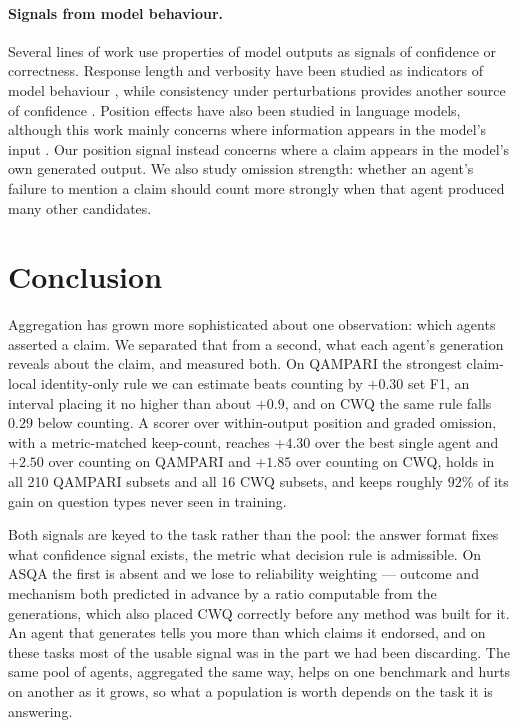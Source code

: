 \documentclass{article}
\begin{document}
\paragraph{Signals from model behaviour.}
Several lines of work use properties of model outputs as signals of confidence or correctness. Response length and verbosity have been studied as indicators of model behaviour \cite{janiak2025illusion,zhang2024verbosity}, while consistency under perturbations provides another source of confidence \cite{wu2026this,ahn2025prompt}. Position effects have also been studied in language models, although this work mainly concerns where information appears in the model's input \cite{guo2024serial,zhang2026position,salvatore2025lost,qiao2026llm}. Our position signal instead concerns where a claim appears in the model's own generated output. We also study omission strength: whether an agent's failure to mention a claim should count more strongly when that agent produced many other candidates.



\section{Conclusion}
\label{sec:conclusion}

Aggregation has grown more sophisticated about one observation: which agents asserted a claim. We separated that from a second, what each agent's generation reveals about the claim, and measured both. On QAMPARI the strongest claim-local identity-only rule we can estimate beats counting by $+0.30$ set F1, an interval placing it no higher than about $+0.9$, and on CWQ the same rule falls $0.29$ below counting. A scorer over within-output position and graded omission, with a metric-matched keep-count, reaches $+4.30$ over the best single agent and $+2.50$ over counting on QAMPARI and $+1.85$ over counting on CWQ, holds in all 210 QAMPARI subsets and all 16 CWQ subsets, and keeps roughly $92\%$ of its gain on question types never seen in training.

Both signals are keyed to the task rather than the pool: the answer format fixes what confidence signal exists, the metric what decision rule is admissible. On ASQA the first is absent and we lose to reliability weighting --- outcome and mechanism both predicted in advance by a ratio computable from the generations, which also placed CWQ correctly before any method was built for it. An agent that generates tells you more than which claims it endorsed, and on these tasks most of the usable signal was in the part we had been discarding. The same pool of agents, aggregated the same way, helps on one benchmark and hurts on another as it grows, so what a population is worth depends on the task it is answering.
\end{document}
